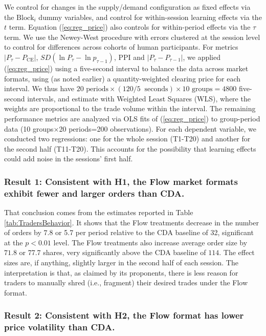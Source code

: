 \documentclass[12pt]{article}
\begin{document}
We control for changes in the supply/demand configuration as fixed effects via the $\text{Block}_i$ dummy variables,
and control for within-session learning effects via the $t$ term.
Equation (\ref{eq:reg_price}) also controls for within-period effects via the $\tau$ term. 
We use the Newey-West procedure with errors clustered at the session level to control for differences across cohorts of human participants.
For metrics $\lvert P_{\tau} - P_{\text{CE}}\rvert$, $SD\left(\ln P_{\tau} - \ln p_{{\tau} - 1}\right)$, PPI and $\lvert P_{{\tau}} - P_{{\tau} - 1}\rvert$, we applied (\ref{eq:reg_price}) using a five-second interval to balance the data across market formats, using (as noted earlier) a quantity-weighted clearing price for each interval. %
We thus have $20 \text{ periods} \times (120  / 5 \ \text{  seconds}) \times 10 \text{ groups}= 4800$ five-second intervals, and 
estimate with Weighted Least Squares (WLS), where the weights are proportional to the trade volume within the interval. 
The remaining performance metrics are analyzed via OLS fits of (\ref{eq:reg_price}) to group-period data (10 groups×20 periods=200 observations). 
For each dependent variable, we conducted two regressions: one for the whole session (T1-T20) and another for the second half (T11-T20). This accounts for the possibility that learning effects could add noise in the sessions' first half. 


\subsubsection*{Result 1: 
Consistent with H1, the Flow market formats exhibit fewer and larger orders than CDA.}

That conclusion comes from the estimates reported in Table \ref{tab:TradersBehavior}.
It shows that the Flow treatments decrease in the number of orders by $7.8$ or 5.7 per period relative to the CDA baseline of 32, significant at the $p<0.01$ level. 
The Flow treatments also increase average order size by $71.8$ or 77.7 shares, very significantly above the CDA baseline of $114$. 
The effect sizes are, if anything, slightly larger in the second half of each session. 
The interpretation is that, as claimed by its proponents, there is less reason for traders to manually shred (i.e., fragment) their desired trades under the Flow format.

\subsubsection*{Result 2: Consistent with H2, the Flow format has lower price volatility than CDA.}
\end{document}
